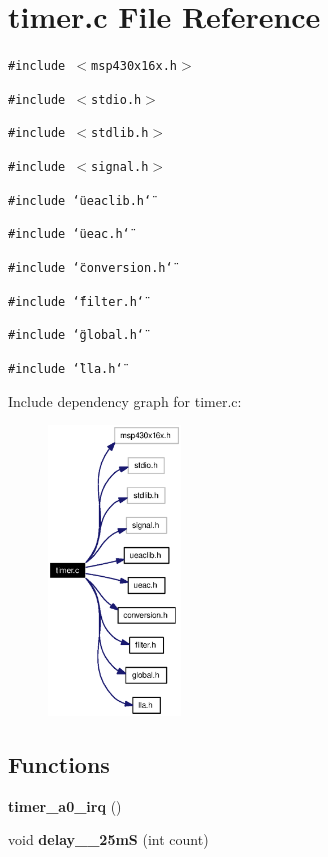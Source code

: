 \section{timer.c File Reference}
\label{timer_8c}
{\tt \#include $<$msp430x16x.h$>$}\par
{\tt \#include $<$stdio.h$>$}\par
{\tt \#include $<$stdlib.h$>$}\par
{\tt \#include $<$signal.h$>$}\par
{\tt \#include \char`\"{}ueaclib.h\char`\"{}}\par
{\tt \#include \char`\"{}ueac.h\char`\"{}}\par
{\tt \#include \char`\"{}conversion.h\char`\"{}}\par
{\tt \#include \char`\"{}filter.h\char`\"{}}\par
{\tt \#include \char`\"{}global.h\char`\"{}}\par
{\tt \#include \char`\"{}lla.h\char`\"{}}\par


Include dependency graph for timer.c:\begin{figure}[H]
\begin{center}
\leavevmode
\includegraphics[width=100pt]{timer_8c__incl}
\end{center}
\end{figure}
\subsection*{Functions}
\begin{CompactItemize}
\item 
{\bf timer\_\-a0\_\-irq} ()
\item 
void {\bf delay\_\_\-25m\-S} (int count)
\end{CompactItemize}


